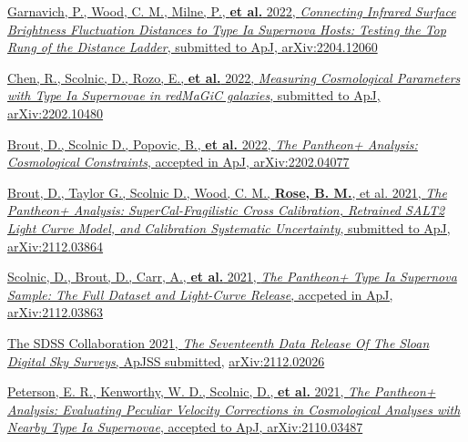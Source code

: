 \documentclass[margin]{res}
\begin{document}
\begin{resume}
\hangindent=15pt 
\href{https://ui.adsabs.harvard.edu/abs/2022arXiv220412060G/abstract}{Garnavich, P., Wood, C. M., Milne, P., \textbf{et al.} 2022, {\sl Connecting Infrared Surface Brightness Fluctuation Distances to Type Ia Supernova Hosts: Testing the Top Rung of the Distance Ladder}, submitted to ApJ, arXiv:2204.12060}
\vspace{-12pt}

\hangindent=15pt 
\href{https://ui.adsabs.harvard.edu/abs/2022arXiv220210480C/abstract}{Chen, R., Scolnic, D., Rozo, E., \textbf{et al.} 2022, {\sl Measuring Cosmological Parameters with Type Ia Supernovae in redMaGiC galaxies}, submitted to ApJ, 
 arXiv:2202.10480}
\vspace{-12pt}

\hangindent=15pt 
\href{https://ui.adsabs.harvard.edu/abs/2022arXiv220204077B/abstract}{Brout, D., Scolnic D., Popovic, B., \textbf{et al.} 2022, {\sl The Pantheon+ Analysis: Cosmological Constraints}, accepted in ApJ, 
 arXiv:2202.04077}
\vspace{-12pt}

\hangindent=15pt 
\href{https://ui.adsabs.harvard.edu/abs/2021arXiv211203864B/abstract}{Brout, D., Taylor G., Scolnic D., Wood, C. M., \textbf{Rose, B. M.}, et al. 2021, {\sl The Pantheon+ Analysis: SuperCal-Fragilistic Cross Calibration, Retrained SALT2 Light Curve Model, and Calibration Systematic Uncertainty}, submitted to ApJ, 
 arXiv:2112.03864}
\vspace{-12pt}

\hangindent=15pt 
\href{https://ui.adsabs.harvard.edu/abs/2021arXiv211203863S/abstract}{Scolnic, D., Brout, D., Carr, A., {\bf et al.} 2021, {\sl The Pantheon+ Type Ia Supernova Sample: The Full Dataset and Light-Curve Release}, accpeted in ApJ, 
 arXiv:2112.03863}
\vspace{-12pt}

\hangindent=15pt 
\href{}{The SDSS Collaboration 2021, {\sl The Seventeenth Data Release Of The Sloan Digital Sky Surveys}, ApJSS submitted,} \href{http://arxiv.org/abs/2112.02026}{arXiv:2112.02026}
\vspace{-12pt}

\hangindent=15pt 
\href{https://ui.adsabs.harvard.edu/abs/2021arXiv211003487P/abstract}{Peterson, E. R., Kenworthy, W. D.,  Scolnic, D., {\bf et al.} 2021, {\sl The Pantheon+ Analysis: Evaluating Peculiar Velocity Corrections in Cosmological Analyses with Nearby Type Ia Supernovae}, accepted to ApJ, 
 arXiv:2110.03487}
\vspace{-12pt}


\end{resume}
\end{document}
